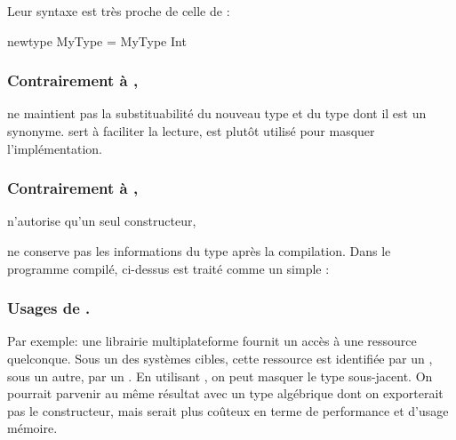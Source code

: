 Leur syntaxe est très proche de celle de :

\begin{haskellcode}
newtype MyType = MyType Int
\end{haskellcode}

\subsubsection{Contrairement à ,}  ne maintient pas la substituabilité du nouveau type et du type dont il est un synonyme.  sert à faciliter la lecture,  est plutôt utilisé pour masquer l'implémentation.

\subsubsection{Contrairement à ,} 
\begin{ilenum}
    \item n'autorise qu'un seul constructeur,
    \item ne conserve pas les informations du type après la compilation. Dans le programme compilé,  ci-dessus est traité comme un simple :
\end{ilenum}



\subsubsection{Usages de .}

Par exemple: une librairie multiplateforme fournit un accès à une ressource quelconque. Sous un des systèmes cibles, cette ressource est identifiée par un , sous un autre, par un . En utilisant , on peut masquer le type sous-jacent. On pourrait parvenir au même résultat avec un type algébrique dont on exporterait pas le constructeur\todo{\\qsee}, mais serait plus coûteux en terme de performance et d'usage mémoire.

